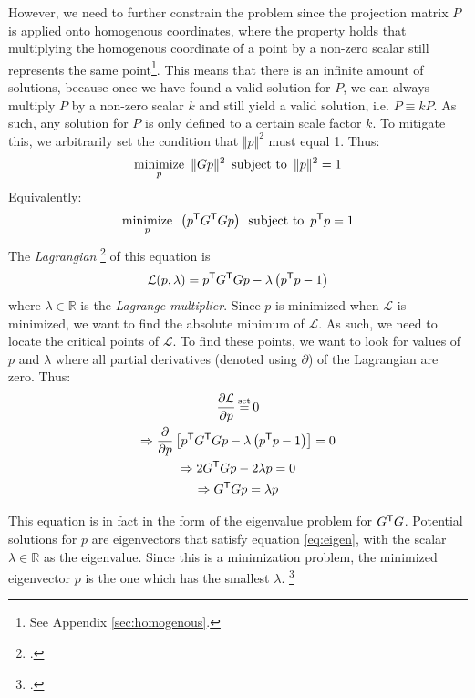However, we need to further constrain the problem since the projection matrix $P$ is applied onto homogenous coordinates, where the property holds that multiplying the homogenous coordinate of a point by a non-zero scalar still represents the same point\footnote{See Appendix \ref{sec:homogenous}.}. This means that there is an infinite amount of solutions, because once we have found a valid solution for $P$, we can always multiply $P$ by a non-zero scalar $k$ and still yield a valid solution, i.e. $P \equiv kP$. As such, any solution for $P$ is only defined to a certain scale factor $k$. To mitigate this, we arbitrarily set the condition that $\Vert p \Vert^2$ must equal 1. Thus:
\begin{equation*} \label{eq:min1}
    \underset{p}{\text{minimize}}\enspace \lVert Gp \rVert^2 \enspace \text{subject to} \enspace \lVert p \rVert^2 = 1
\end{equation*}
Equivalently:
\begin{equation} \label{eq:min2}
    \underset{p}{\text{minimize}}\enspace \left(p^{\mathsf{T}} G^{\mathsf{T}} Gp\right) \enspace \text{subject to} \enspace p^{\mathsf{T}} p = 1
\end{equation}
The \emph{Lagrangian} \footcite[][2]{ghojoghEigenvalueGeneralized2023} of this equation is
\begin{equation}
    \mathcal{L}(p, \lambda) = p^{\mathsf{T}} G^{\mathsf{T}} Gp - \lambda \left( p^{\mathsf{T}} p - 1 \right)
\end{equation}
where $\lambda \in \mathbb{R}$ is the \emph{Lagrange multiplier}. Since $p$ is minimized when $\mathcal{L}$ is minimized, we want to find the absolute minimum of $\mathcal{L}$. As such, we need to locate the critical points of $\mathcal{L}$. To find these points, we want to look for values of $p$ and $\lambda$ where all partial derivatives (denoted using $\partial$) of the Lagrangian are zero. Thus:
\begin{gather}
    \frac{\partial \mathcal{L}}{\partial p} \seteq 0 \nonumber\\
    \Rightarrow \frac{\partial}{\partial p} \left[ p^\T G^\T Gp - \lambda \left( p^\T p - 1 \right) \right] = 0 \nonumber \\
    \Rightarrow 2G^\T Gp - 2 \lambda p = 0 \nonumber \\
    \Rightarrow G^\T Gp = \lambda p \label{eq:eigen}
\end{gather}

This equation is in fact in the form of the eigenvalue problem for $G^{\mathsf{T}} G$. Potential solutions for $p$ are eigenvectors that satisfy equation \ref{eq:eigen}, with the scalar $\lambda \in \mathbb{R}$ as the eigenvalue. Since this is a minimization problem, the minimized eigenvector $p$ is the one which has the smallest $\lambda$. \footcite[][2]{ghojoghEigenvalueGeneralized2023}
